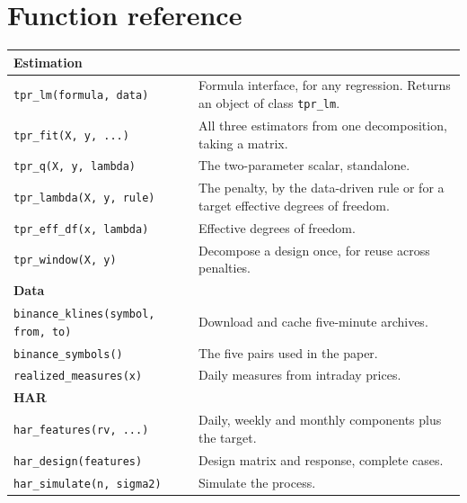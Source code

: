 \documentclass[11pt,a4paper]{report}
\begin{document}

\chapter{Function reference}

\begin{longtable}{p{} p{}}
\toprule
\textbf{Estimation} & \\
\midrule
\texttt{tpr\_lm(formula, data)} & Formula interface, for any
regression. Returns an object of class \texttt{tpr\_lm}. \\
\texttt{tpr\_fit(X, y, ...)} & All three estimators from one
decomposition, taking a matrix. \\
\texttt{tpr\_q(X, y, lambda)} & The two-parameter scalar, standalone. \\
\texttt{tpr\_lambda(X, y, rule)} & The penalty, by the data-driven rule
or for a target effective degrees of freedom. \\
\texttt{tpr\_eff\_df(x, lambda)} & Effective degrees of freedom. \\
\texttt{tpr\_window(X, y)} & Decompose a design once, for reuse across
penalties. \\
\addlinespace
\toprule
\textbf{Data} & \\
\midrule
\texttt{binance\_klines(symbol, from, to)} & Download and cache
five-minute archives. \\
\texttt{binance\_symbols()} & The five pairs used in the paper. \\
\texttt{realized\_measures(x)} & Daily measures from intraday prices. \\
\addlinespace
\toprule
\textbf{HAR} & \\
\midrule
\texttt{har\_features(rv, ...)} & Daily, weekly and monthly components
plus the target. \\
\texttt{har\_design(features)} & Design matrix and response, complete
cases. \\
\texttt{har\_simulate(n, sigma2)} & Simulate the process. \\

\end{longtable}
\end{document}

